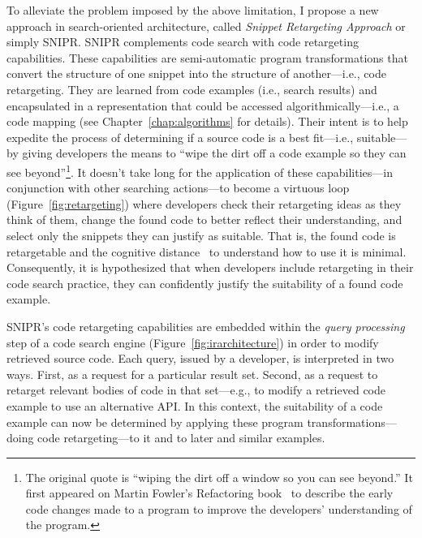 To alleviate the problem imposed by the above limitation, I propose a new approach in search-oriented architecture, called \emph{Snippet Retargeting Approach} or simply \uppercase{SnipR}. \uppercase{SnipR} complements code search with code retargeting capabilities. These capabilities are semi-automatic program transformations that convert the structure of one snippet into the structure of another---i.e., code retargeting. They are learned from code examples (i.e., search results) and encapsulated in a representation that could be accessed algorithmically---i.e., a code mapping (see Chapter~\ref{chap:algorithms} for details). Their intent is to help expedite the process of determining if a source code is a best fit---i.e., suitable---by giving developers the means to ``wipe the dirt off a code example so they can see beyond''\footnote{The original quote is ``wiping the dirt off a window so you can see beyond.'' It first appeared on Martin Fowler's Refactoring book~\cite{Fowler:1999vp} to describe the early code changes made to a program to improve the developers' understanding of the program.}. It doesn’t take long for the application of these capabilities---in conjunction with other searching actions---to become a virtuous loop (Figure~\ref{fig:retargeting}) where developers check their retargeting ideas as they think of them, change the found code to better reflect their understanding, and select only the snippets they can justify as suitable. That is, the found code is retargetable and the cognitive distance~\cite{Krueger:1992wf} to understand how to use it is minimal. Consequently, it is hypothesized that when developers include retargeting in their code search practice, they can confidently justify the suitability of a found code example.     

\uppercase{SnipR}'s code retargeting capabilities are embedded within the \emph{query processing} step of a code search engine (Figure~\ref{fig:irarchitecture}) in order to modify retrieved source code. Each query, issued by a developer, is interpreted in two ways. First, as a request for a particular result set. Second, as a request to retarget relevant bodies of code in that set---e.g., to modify a retrieved code example to use an alternative API. In this context, the suitability of a code example can now be determined by applying these program transformations---doing code retargeting---to it and to later and similar examples. 

